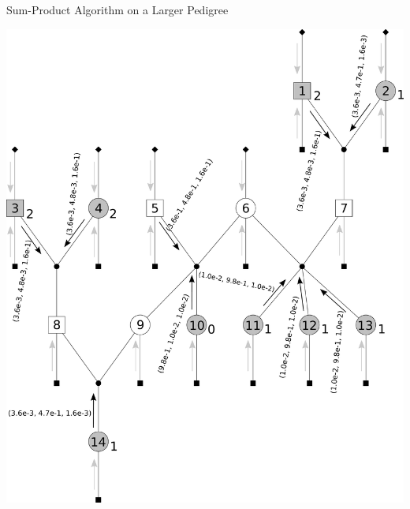 \documentclass[letter,graphicx]{beamer}
\begin{document}
\begin{frame}{Sum-Product Algorithm on a Larger Pedigree} 
\begin{center} 
\includegraphics[height = 0.8\textheight]{./images/mg-example-step2.pdf} 
\end{center}
\end{frame}
\end{document}

